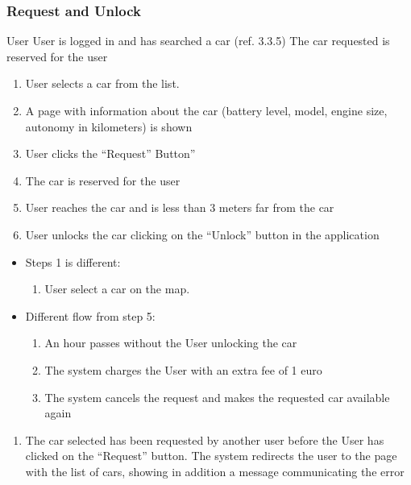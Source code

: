 \subsubsection{Request and Unlock}\label{request}
{User}
{}
{User is logged in and has searched a car (ref. 3.3.5)}
{The car requested is reserved for the user}
{
\begin{enumerate}
	\item User selects a car from the list. 
	\item A page with information about the car (battery level, model, engine size, autonomy in kilometers) is shown
	\item User clicks the ``Request'' Button''
	\item The car is reserved for the user
	\item User reaches the car and is less than 3 meters far from the car
	\item User unlocks the car clicking on the ``Unlock'' button in the application

\end{enumerate}
}
{
\begin{itemize}
\item Steps 1 is different:
	\begin{enumerate}
	\item[1] User select a car on the map.   
	\end{enumerate}
\item Different flow from step 5:
	\begin{enumerate}
	\item[5] An hour passes without the User unlocking the car
	\item[6]The system charges the User with an extra fee of 1 euro
	\item [7]The system cancels the request and makes the requested car available again
	\end{enumerate}
\end{itemize}


}
{
\begin{enumerate}
\item The car selected has been requested by another user before the User has clicked on the ``Request'' button. The system redirects the user to the page with the list of cars, showing in addition a message communicating the error 
\end{enumerate}
}
\pagebreak


